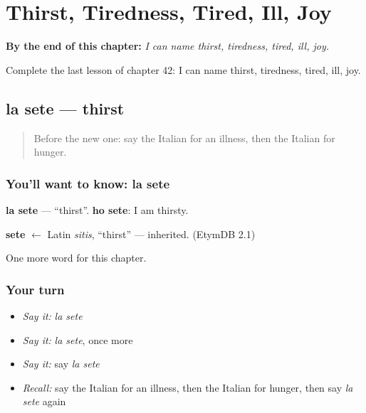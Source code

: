 
\chapter{Thirst, Tiredness, Tired, Ill, Joy}
\label{ch:it-thirst-tiredness-tired-ill-joy}

\begin{chapteropening}
\textbf{By the end of this chapter:} \emph{I can name thirst, tiredness, tired, ill, joy.}

Complete the last lesson of chapter 42: I can name thirst, tiredness, tired, ill, joy.
\end{chapteropening}

\section[la sete]{la sete — thirst}

\label{lesson:IT-C42-sete}



\begin{quote}
Before the new one: say the Italian for an illness, then the Italian for hunger.
\end{quote}

\subsection*{You'll want to know: la sete}
\textbf{la sete} — \textquotedblleft{}thirst\textquotedblright{}. \textbf{ho sete}: I am thirsty.

\begin{cousinweb}
\textbf{sete} $\leftarrow$ Latin \emph{sitis}, \textquotedblleft{}thirst\textquotedblright{} — inherited. (EtymDB 2.1)
\end{cousinweb}

\begin{grammarlens}[title={What you've built}]
One more word for this chapter.
\end{grammarlens}

\subsection*{Your turn}
\begin{itemize}
\raggedright
  \item \emph{Say it:} \emph{la sete}
  \item \emph{Say it:} \emph{la sete}, once more
  \item \emph{Say it:} say \emph{la sete}
  \item \emph{Recall:} say the Italian for an illness, then the Italian for hunger, then say \emph{la sete} again
\end{itemize}

